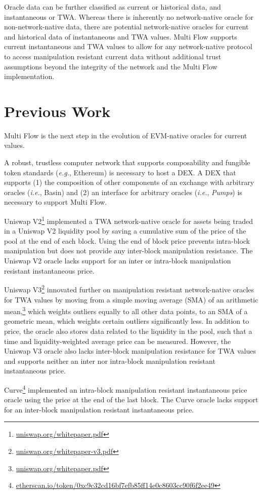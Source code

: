 \documentclass[tikz]{article}
\newcommand{\term}[1]{\textsl{#1}}
\newcommand{\fref}[1]{\footnote{\href{http://#1}{#1}}}
\begin{document}
Oracle data can be further classified as current or historical data, and instantaneous or TWA. Whereas there is inherently no network-native oracle for non-network-native data, there are potential network-native oracles for current and historical data of instantaneous and TWA values. Multi Flow supports current instantaneous and TWA values to allow for any network-native protocol to access manipulation resistant current data without additional trust assumptions beyond the integrity of the network and the Multi Flow implementation. 

\section{Previous Work}
Multi Flow is the next step in the evolution of EVM-native oracles for current values.

A robust, trustless computer network that supports composability and fungible token standards (\textit{e.g.}, Ethereum) is necessary to host a DEX. A DEX that supports (1) the composition of other components of an exchange with arbitrary oracles (\textit{i.e.}, Basin) and (2) an interface for arbitrary oracles (\textit{i.e.}, \term{Pumps}) is necessary to support Multi Flow. 

Uniswap V2\fref{uniswap.org/whitepaper.pdf} implemented a TWA network-native oracle for assets being traded in a Uniswap V2 liquidity pool by saving a cumulative sum of the price of the pool at the end of each block. Using the end of block price prevents intra-block manipulation but does not provide any inter-block manipulation resistance. The Uniswap V2 oracle lacks support for an inter or intra-block manipulation resistant instantaneous price. 

Uniswap V3\fref{uniswap.org/whitepaper-v3.pdf} innovated further on manipulation resistant network-native oracles for TWA values by moving from a simple moving average (SMA) of an arithmetic mean,\fref{uniswap.org/whitepaper.pdf} which weights outliers equally to all other data points, to an SMA of a geometric mean, which weights certain outliers significantly less. In addition to price, the oracle also stores data related to the liquidity in the pool, such that a time and liquidity-weighted average price can be measured. However, the Uniswap V3 oracle also lacks inter-block manipulation resistance for TWA values and supports neither an inter nor intra-block manipulation resistant instantaneous price.

Curve\fref{etherscan.io/token/0xc9c32cd16bf7efb85ff14e0c8603cc90f6f2ee49} implemented an intra-block manipulation resistant instantaneous price oracle using the price at the end of the last block. The Curve oracle lacks support for an inter-block manipulation resistant instantaneous price. 
\end{document}
